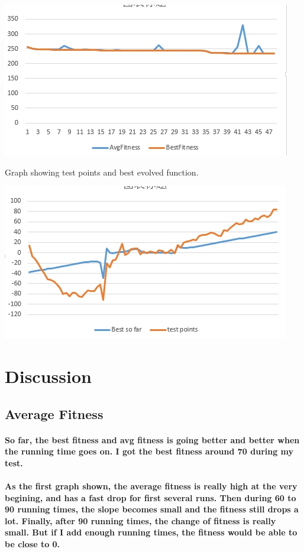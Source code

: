 \documentclass[11pt]{article} %
\begin{document}
\includegraphics[scale=.7]{90to1000.jpg}


\newpage
Graph showing test points and best evolved function.

\includegraphics[scale=1]{err.jpg}

\section{Discussion}
\subsection{Average Fitness}
\paragraph{So far, the best fitness and avg fitness is going better and better when the running time goes on. I got the best fitness around 70 during my test. }
\paragraph{As the first graph shown, the average fitness is really high at the very begining, and has a fast drop for first several runs. Then during 60 to 90 running times, the slope becomes small and the fitness still drops a lot. Finally, after 90 running times, the change of fitness is really small. But if I add enough running times, the fitness would be able to be close to 0.}
\end{document}
